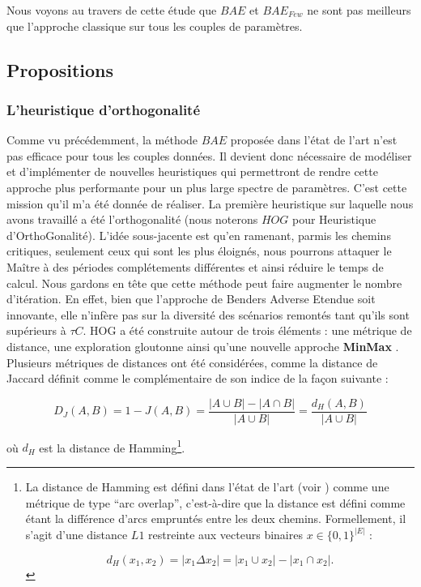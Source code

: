 \documentclass[12pt, a4paper, twoside]{report}
\numberwithin{equation}{section}
\newcommand{\mmx}{\textbf{MinMax} }
\begin{document}
	Nous voyons au travers de cette étude que $BAE$ et $BAE_{Few}$ ne sont pas meilleurs que l'approche classique sur tous les couples de paramètres.
	
	\subsection{Propositions}
	
	\subsubsection{L'heuristique d'orthogonalité}
	
	Comme vu précédemment, la méthode $BAE$ proposée dans l'état de l'art n'est pas efficace pour tous les couples données. Il devient donc nécessaire de modéliser et d'implémenter de nouvelles heuristiques qui permettront de rendre cette approche plus performante pour un plus large spectre de paramètres. C'est cette mission qu'il m'a été donnée de réaliser. La première heuristique sur laquelle nous avons travaillé a été l'orthogonalité (nous noterons $HOG$ pour Heuristique d'OrthoGonalité).
	L'idée sous-jacente est qu'en ramenant, parmis les chemins critiques, seulement ceux qui sont les plus éloignés, nous pourrons attaquer le Maître à des périodes complétements différentes et ainsi réduire le temps de calcul. Nous gardons en tête que cette méthode peut faire augmenter le nombre d'itération. En effet, bien que l'approche de Benders Adverse Etendue soit innovante, elle n'infère pas sur la diversité des scénarios remontés tant qu'ils sont supérieurs à $\tau C$.
	HOG a été construite autour de trois éléments : une métrique de distance, une exploration gloutonne ainsi qu'une nouvelle approche \mmx. Plusieurs métriques de distances ont été considérées, comme la distance de Jaccard définit comme le complémentaire de son indice de la façon suivante :
	
	\begin{equation}
		D_J(A, B)
		= 1 - J(A, B)
		= \frac{|A \cup B| - |A \cap B|}{|A \cup B|}
		= \frac{d_H(A, B)}{|A \cup B|}
	\end{equation}
	
	\noindent où \(d_H\) est la distance de Hamming\footnote{La distance de Hamming est défini dans l'état de l'art (voir \cite{hamming_dist_scheduling_prbl}) comme une métrique de type \enquote{arc overlap}, c'est-à-dire que la distance est défini comme étant la différence d'arcs empruntés entre les deux chemins. Formellement, il s'agit d'une distance $L1$ restreinte aux vecteurs binaires $x\in\{0, 1\}^{|E|}$ :
		
		\[
		d_H(x_1,x_2)=|x_1\Delta x_2|=|x_1\cup x_2|-|x_1\cap x_2|.
		\]
	}.
	
\end{document}
